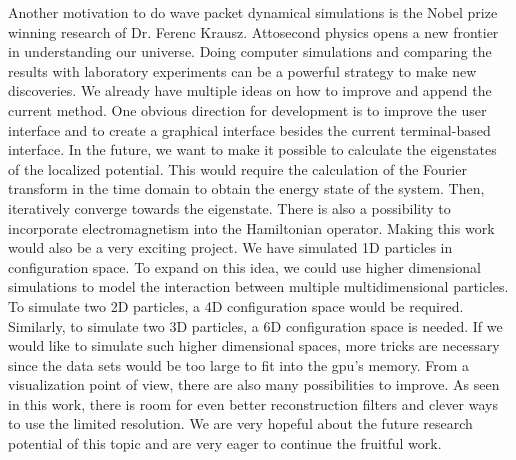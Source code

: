 Another motivation to do wave packet dynamical simulations is the Nobel prize winning research of Dr. Ferenc Krausz. Attosecond physics opens a new frontier in understanding our universe.
Doing computer simulations and comparing the results with laboratory experiments can be a powerful strategy to make new discoveries.
We already have multiple ideas on how to improve and append the current method.
One obvious direction for development is to improve the user interface and to create a graphical interface besides the current terminal-based interface.
In the future, we want to make it possible to calculate the eigenstates of the localized potential.
This would require the calculation of the Fourier transform in the time domain to obtain the energy state of the system.
Then, iteratively converge towards the eigenstate.
There is also a possibility to incorporate electromagnetism into the Hamiltonian operator.
Making this work would also be a very exciting project.
We have simulated 1D particles in configuration space.
To expand on this idea, we could use higher dimensional simulations to model the interaction between multiple multidimensional particles.
To simulate two 2D particles, a 4D configuration space would be required.
Similarly, to simulate two 3D particles, a 6D configuration space is needed.
If we would like to simulate such higher dimensional spaces, more tricks are necessary since the data sets would be too large to fit into the \acrshort{gpu}'s memory.
From a visualization point of view, there are also many possibilities to improve.
As seen in this work, there is room for even better reconstruction filters
and clever ways to use the limited resolution.
We are very hopeful about the future research potential of this topic and are very eager to continue the fruitful work.



